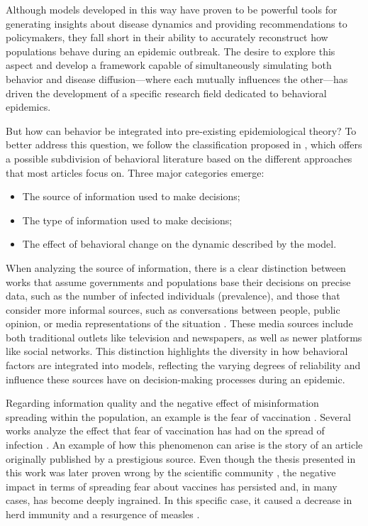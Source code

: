 Although models developed in this way have proven to be powerful tools for generating insights about disease dynamics and providing recommendations to policymakers, they fall short in their ability to accurately reconstruct how populations behave during an epidemic outbreak. The desire to explore this aspect and develop a framework capable of simultaneously simulating both behavior and disease diffusion—where each mutually influences the other—has driven the development of a specific research field dedicated to behavioral epidemics.

But how can behavior be integrated into pre-existing epidemiological theory? To better address this question, we follow the classification proposed in \cite{Funk_2010}, which offers a possible subdivision of behavioral literature based on the different approaches that most articles focus on. Three major categories emerge:
\begin{itemize}
	\item The source of information used to make decisions;
	\item The type of information used to make decisions;
	\item The effect of behavioral change on the dynamic described by  the model. 
\end{itemize}
When analyzing the source of information, there is a clear distinction between works that assume governments and populations base their decisions on precise data, such as the number of infected individuals (prevalence), and those that consider more informal sources, such as conversations between people, public opinion, or media representations of the situation \cite{Bulai2023}. These media sources include both traditional outlets like television and newspapers, as well as newer platforms like social networks.
This distinction highlights the diversity in how behavioral factors are integrated into models, reflecting the varying degrees of reliability and influence these sources have on decision-making processes during an epidemic.


Regarding information quality and the negative effect of misinformation spreading within the population, an example is the fear of vaccination \cite{Kahan_2013}. Several works analyze the effect that fear of vaccination has had on the spread of infection \cite{Bauch_2012_game, Epstein_2021}.
An example of how this phenomenon can arise is the story of an article originally published by a prestigious source. Even though the thesis presented in this work was later proven wrong by the scientific community \cite{wakefield1998retracted}, the negative impact in terms of spreading fear about vaccines has persisted and, in many cases, has become deeply ingrained. In this specific case, it caused a decrease in herd immunity and a resurgence of measles \cite{Bauch_2012_overview}.


